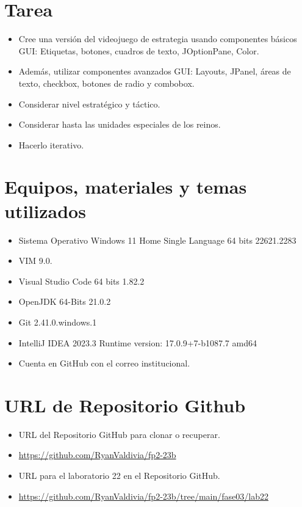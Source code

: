 \documentclass{article}
\begin{document}
	\section{Tarea}
	\begin{itemize}
			\item Cree una versión del videojuego de estrategia usando componentes básicos GUI: Etiquetas, botones,
cuadros de texto, JOptionPane, Color.
			\item Además, utilizar componentes avanzados GUI: Layouts, JPanel, áreas de texto, checkbox, botones de
radio y combobox.
			\item Considerar nivel estratégico y táctico.
			\item Considerar hasta las unidades especiales de los reinos.
			\item Hacerlo iterativo.
	\end{itemize}
		
	\section{Equipos, materiales y temas utilizados}
	\begin{itemize}
		\item Sistema Operativo Windows 11 Home Single Language 64 bits 22621.2283
		\item VIM 9.0.
		\item Visual Studio Code 64 bits 1.82.2
		\item OpenJDK 64-Bits 21.0.2
		\item Git 2.41.0.windows.1
		\item IntelliJ IDEA 2023.3 Runtime version: 17.0.9+7-b1087.7 amd64
		\item Cuenta en GitHub con el correo institucional. 
	\end{itemize}
	
	\section{URL de Repositorio Github}
	\begin{itemize}
		\item URL del Repositorio GitHub para clonar o recuperar.
		\item \url{https://github.com/RyanValdivia/fp2-23b}
		\item URL para el laboratorio 22 en el Repositorio GitHub.
		\item \url{https://github.com/RyanValdivia/fp2-23b/tree/main/fase03/lab22}
	\end{itemize}
	
\end{document}
